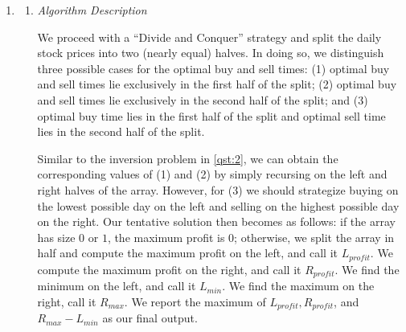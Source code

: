 \documentclass{article}
\begin{document}
\begin{enumerate}[leftmargin={*}, font={\bf}, label={\arabic*.}, ref={\arabic*}]
\begin{enumerate}
      \item \label{qst:3d}
        $T(n) = T(3n/4) + n$. We guess the solution is $T(n) = \O(n)$. According to the definition
        of big-$\O$ notation, we want to find a constant $c > 0$ and an integer $n_0 \geq 1$ such
        that $T(n) \leq cn$ for all sufficiently large $n \geq n_0$. We proceed with (strong)
        induction on $n$ and assume $T(n) \leq cn$ is true for all positive numbers less than $n$.
        Then $T(3n/4) \leq (3/4)cn$ and $T(n) \leq (3/4) cn + n$. Hence, in order to prove $T(n)
        \leq cn$, it is sufficient to prove that $(3/4)cn + n \leq cn$, or equivalently $(3/4)c +
        1 \leq c$. It is easy to see that any $c \geq 4$ suffices. So for any choices of $c \geq 
        4$ and $n_0 = 1$, $T(n) \leq cn$ holds for all sufficiently large $n \geq n_0$. Therefore,
        we conclude $T(n) = \O(n)$.
    \end{enumerate}

  \item \label{qst:4}
    \begin{enumerate}
      \item \label{qst:4a}
        {\it Algorithm Description}

        We proceed with a ``Divide and Conquer'' strategy and split the daily stock prices into
        two (nearly equal) halves. In doing so, we distinguish three possible cases for the optimal
        buy and sell times: (1) optimal buy and sell times lie exclusively in the first half of
        the split; (2) optimal buy and sell times lie exclusively in the second half of the split;
        and (3) optimal buy time lies in the first half of the split and optimal sell time lies in
        the second half of the split.

        Similar to the inversion problem in \ref{qst:2}, we can obtain the corresponding values
        of (1) and (2) by simply recursing on the left and right halves of the array. However,
        for (3) we should strategize buying on the lowest possible day on the left and selling
        on the highest possible day on the right. Our tentative solution then becomes as follows:
        if the array has size $0$ or $1$, the maximum profit is $0$; otherwise, we split the array
        in half and compute the maximum profit on the left, and call it $L_{profit}$. We compute
        the maximum profit on the right, and call it $R_{profit}$. We find the minimum on the left,
        and call it $L_{min}$. We find the maximum on the right, call it $R_{max}$. We report the
        maximum of $L_{profit}, R_{profit}$, and $R_{max} - L_{min}$ as our final output.


\end{enumerate}
\end{enumerate}
\end{document}
